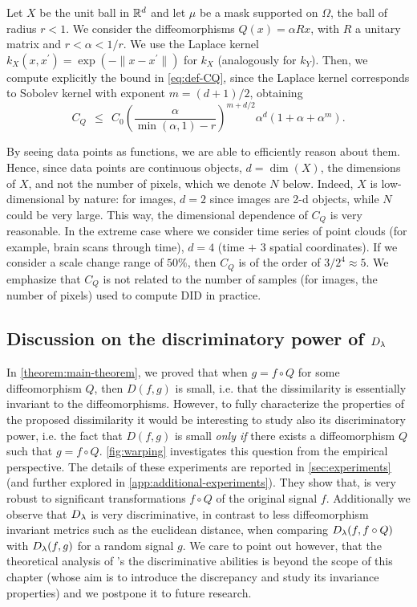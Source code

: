 \begin{example}\label{ex:diffeo}
Let $X$ be the unit ball in $\mathbb R^d$ and let $\mu$ be a mask supported on $\Omega$, the ball of radius $r < 1$. We consider the diffeomorphisms $Q(x) = \alpha R x$, with $R$ a unitary matrix and $r < \alpha < 1/r$. We use the Laplace kernel $k_X(x,x^\prime) = \exp(-\|x-x^\prime\|)$ for $k_X$ (analogously for $k_Y$).
Then, we compute explicitly the bound in \cref{eq:def-CQ}, since the Laplace kernel corresponds to Sobolev kernel with exponent $m = (d+1)/2$, obtaining
$$C_Q ~~\leq~~ C_0 \left(\frac{\alpha}{\min(\alpha,1) - r}\right)^{m+d/2}\alpha^d (1 + \alpha + \alpha^m).$$
\end{example}
\begin{remark}
By seeing data points as functions, we are able to efficiently reason about them. Hence, since data points are continuous objects, $d=\dim(X)$, the dimensions of $X$, and not the number of pixels, which we denote $N$ below. Indeed, $X$ is low-dimensional by nature: for images, $d=2$ since images are 2-d objects, while $N$ could be very large. This way, the dimensional dependence of $C_Q$ is very reasonable. In the extreme case where we consider time series of point clouds (for example, brain scans through time), $d = 4$ (time $+$ 3 spatial coordinates). If we consider a scale change range of $50\%$, then $C_Q$ is of the order of $3/2^4 \approx 5$. We emphasize that $C_Q$ is not related to the number of samples (for images, the number of pixels) used to compute DID in practice.
\end{remark}
\subsection{Discussion on the discriminatory power of $D_\lambda$} \label{sec:discussion-selectivity}
In \cref{theorem:main-theorem}, we proved that when $g = f \circ Q$ for some diffeomorphism $Q$, then $D(f,g)$ is small, i.e. that the dissimilarity is essentially invariant to the diffeomorphisms. However, to fully characterize the properties of the proposed dissimilarity it would be interesting to study also its discriminatory power, i.e. the fact that $D(f,g)$ is small {\em only if} there exists a diffeomorphism $Q$ such that $g = f \circ Q$. \cref{fig:warping} investigates this question from the empirical perspective. The details of these experiments are reported in \cref{sec:experiments} (and further explored in \cref{app:additional-experiments}). They show that, \Diffy is very robust to significant transformations $f\circ Q$ of the original signal $f$. Additionally we observe that $D_\lambda$ is very discriminative, in contrast to less diffeomorphism invariant metrics such as the euclidean distance, when comparing $D_\lambda(f,f\circ Q)$ with $D_\lambda(f,g)$ for a random signal $g$. We care to point out however, that the theoretical analysis of \Diffy's the discriminative abilities is beyond the scope of this chapter (whose aim is to introduce the discrepancy and study its invariance properties) and we postpone it to future research.

